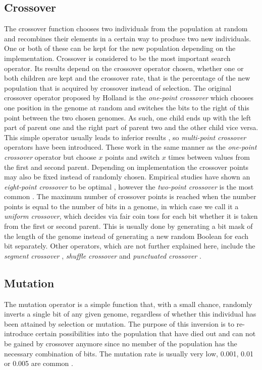 \subsection{Crossover}
\label{sec:crossover}

The crossover function chooses two individuals from the population at random and recombines their elements in a certain way to produce two new individuals. One or both of these can be kept for the new population depending on the implementation. Crossover is considered to be the most important search operator\cite{16}. Its results depend on the crossover operator chosen, whether one or both children are kept and the crossover rate, that is the percentage of the new population that is acquired by crossover instead of selection. The original crossover operator proposed by Holland is the \textit{one-point crossover} which chooses one position in the genome at random and switches the bits to the right of this point between the two chosen genomes. As such, one child ends up with the left part of parent one and the right part of parent two and the other child vice versa. This simple operator usually leads to inferior results \cite{18,19,20}, so \textit{multi-point crossover} operators have been introduced. These work in the same manner as the \textit{one-point crossover} operator but choose $x$ points and switch $x$ times between values from the first and second parent. Depending on implementation the crossover points may also be fixed instead of randomly chosen. Empirical studies have shown an \textit{eight-point crossover} to be optimal \cite{21,22,19}, however the \textit{two-point crossover} is the most common \cite{19}. The maximum number of crossover points is reached when the number points is equal to the number of bits in a genome, in which case we call it a \textit{uniform crossover}, which decides via fair coin toss for each bit whether it is taken from the first or second parent. This is usually done by generating a bit mask of the length of the genome instead of generating a new random Boolean for each bit separately. Other operators, which are not further explained here, include the \textit{segment crossover} \cite{19}, \textit{shuffle crossover} \cite{19} and \textit{punctuated crossover} \cite{23}.

\subsection{Mutation}
\label{sec:mutation}

The mutation operator is a simple function that, with a small chance, randomly inverts a single bit of any given genome, regardless of whether this individual has been attained by selection or mutation. The purpose of this inversion is to re-introduce certain possibilities into the population that have died out and can not be gained by crossover anymore since no member of the population has the necessary combination of bits. The mutation rate is usually very low, 0.001, 0.01 or 0.005 are common \cite{20,23,24}.

